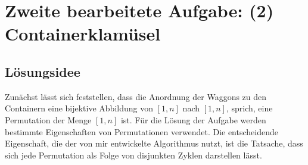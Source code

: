 \lstset{language=Scala}
\chapter{Zweite bearbeitete Aufgabe: (2) Containerklamüsel}
\minitoc
\clearpage
\section{Lösungsidee}
Zunächst lässt sich feststellen,
dass die Anordnung der Waggons zu den Containern eine bijektive Abbildung von $[1,n]$ nach $[1,n]$, sprich, eine Permutation der Menge $[1,n]$ ist.
Für die Lösung der Aufgabe werden bestimmte Eigenschaften von Permutationen verwendet. 
Die entscheidende Eigenschaft, die der von mir entwickelte Algorithmus nutzt, ist die Tatsache,
dass sich jede Permutation als Folge von disjunkten Zyklen darstellen lässt.

